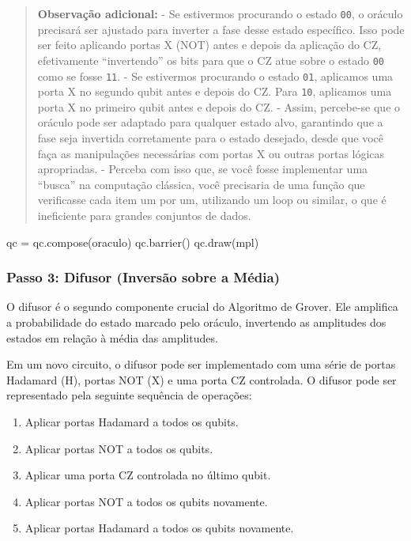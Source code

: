\documentclass[
  brazilian,
]{report}
\newenvironment{Shaded}{\begin{snugshade}}{\end{snugshade}}
\newcommand{\NormalTok}[1]{\textcolor[rgb]{0.00,0.23,0.31}{#1}}
\providecommand{\tightlist}{%
  \setlength{\itemsep}{0pt}\setlength{\parskip}{0pt}}
\begin{document}
\begin{quote}
\textbf{Observação adicional:} - Se estivermos procurando o estado
\texttt{00}, o oráculo precisará ser ajustado para inverter a fase desse
estado específico. Isso pode ser feito aplicando portas X (NOT) antes e
depois da aplicação do CZ, efetivamente ``invertendo'' os bits para que
o CZ atue sobre o estado \texttt{00} como se fosse \texttt{11}. - Se
estivermos procurando o estado \texttt{01}, aplicamos uma porta X no
segundo qubit antes e depois do CZ. Para \texttt{10}, aplicamos uma
porta X no primeiro qubit antes e depois do CZ. - Assim, percebe-se que
o oráculo pode ser adaptado para qualquer estado alvo, garantindo que a
fase seja invertida corretamente para o estado desejado, desde que você
faça as manipulações necessárias com portas X ou outras portas lógicas
apropriadas. - Perceba com isso que, se você fosse implementar uma
``busca'' na computação clássica, você precisaria de uma função que
verificasse cada item um por um, utilizando um loop ou similar, o que é
ineficiente para grandes conjuntos de dados.
\end{quote}

\begin{Shaded}
\begin{Highlighting}[]

\NormalTok{qc = qc.compose(oraculo)}
\NormalTok{qc.barrier()}
\NormalTok{qc.draw(\textquotesingle{}mpl\textquotesingle{})}
\end{Highlighting}
\end{Shaded}

\subsubsection{Passo 3: Difusor (Inversão sobre a
Média)}\label{passo-3-difusor-inversuxe3o-sobre-a-muxe9dia}

O difusor é o segundo componente crucial do Algoritmo de Grover. Ele
amplifica a probabilidade do estado marcado pelo oráculo, invertendo as
amplitudes dos estados em relação à média das amplitudes.

Em um novo circuito, o difusor pode ser implementado com uma série de
portas Hadamard (H), portas NOT (X) e uma porta CZ controlada. O difusor
pode ser representado pela seguinte sequência de operações:

\begin{enumerate}
\def\labelenumi{\arabic{enumi}.}
\tightlist
\item
  Aplicar portas Hadamard a todos os qubits.
\item
  Aplicar portas NOT a todos os qubits.
\item
  Aplicar uma porta CZ controlada no último qubit.
\item
  Aplicar portas NOT a todos os qubits novamente.
\item
  Aplicar portas Hadamard a todos os qubits novamente.
\end{enumerate}
\end{document}
